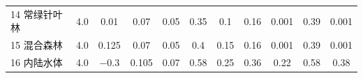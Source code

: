 \begin{landscape}
\begin{table}[htbp]
\begin{tabular}{@{}lcccccccccc@{}}
        14 常绿针叶林   & 4.0        & \num { 0.01  }                                                                       & 0.07                                                                                                            & 0.05                                                                                                            & 0.35                                                                                                            & 0.1                                                                                                             & 0.16                                                                                                            & 0.001                                                                                                           & 0.39                                                                                                            & 0.001                                                                                                           \\
        15 混合森林    & 4.0        & \num { 0.125 }                                                                       & 0.07                                                                                                            & 0.05                                                                                                            & 0.4                                                                                                             & 0.15                                                                                                            & 0.16                                                                                                            & 0.001                                                                                                           & 0.39                                                                                                            & 0.001                                                                                                           \\
        16 内陆水体    & 4.0        & \num { -0.3  }                                                                       & 0.105                                                                                                           & 0.07                                                                                                            & 0.58                                                                                                            & 0.25                                                                                                            & 0.36                                                                                                            & 0.22                                                                                                            & 0.58                                                                                                            & 0.38                                                                                                            \\

\end{tabular}
\end{table}
\end{landscape}
